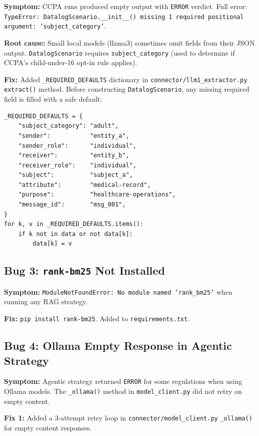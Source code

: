 \documentclass[11pt,letterpaper]{article}
\begin{document}
\begin{appendices}
\textbf{Symptom:} CCPA runs produced empty output with \texttt{ERROR} verdict. Full error: \texttt{TypeError: DatalogScenario.\_\_init\_\_() missing 1 required positional argument: 'subject\_category'}.

\textbf{Root cause:} Small local models (llama3) sometimes omit fields from their JSON output. \texttt{DatalogScenario} requires \texttt{subject\_category} (used to determine if CCPA's child-under-16 opt-in rule applies).

\textbf{Fix:} Added \texttt{\_REQUIRED\_DEFAULTS} dictionary in \texttt{connector/llm1\_extractor.py} \texttt{extract()} method. Before constructing \texttt{DatalogScenario}, any missing required field is filled with a safe default:
\begin{lstlisting}[style=soufflestyle,caption={Required field defaults in llm1\_extractor.py}]
_REQUIRED_DEFAULTS = {
    "subject_category": "adult",
    "sender":           "entity_a",
    "sender_role":      "individual",
    "receiver":         "entity_b",
    "receiver_role":    "individual",
    "subject":          "subject_a",
    "attribute":        "medical-record",
    "purpose":          "healthcare-operations",
    "message_id":       "msg_001",
}
for k, v in _REQUIRED_DEFAULTS.items():
    if k not in data or not data[k]:
        data[k] = v
\end{lstlisting}

\subsection{Bug 3: \texttt{rank-bm25} Not Installed}

\textbf{Symptom:} \texttt{ModuleNotFoundError: No module named 'rank\_bm25'} when running any RAG strategy.

\textbf{Fix:} \texttt{pip install rank-bm25}. Added to \texttt{requirements.txt}.

\subsection{Bug 4: Ollama Empty Response in Agentic Strategy}

\textbf{Symptom:} Agentic strategy returned \texttt{ERROR} for some regulations when using Ollama models. The \texttt{\_ollama()} method in \texttt{model\_client.py} did not retry on empty content.

\textbf{Fix 1:} Added a 3-attempt retry loop in \texttt{connector/model\_client.py} \texttt{\_ollama()} for empty content responses.


\end{appendices}
\end{document}

